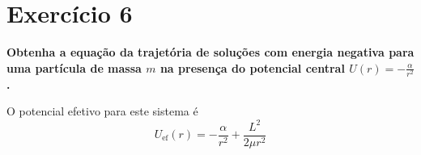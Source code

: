 \section*{Exercício 6}
\textbf{Obtenha a equação da trajetória de soluções com energia negativa para uma partícula de massa \(m\) na presença do potencial central \(U(r) = -\frac{\alpha}{r^2}\).}

O potencial efetivo para este sistema é
\begin{equation*}
    U_\mathrm{ef}(r) = -\frac{\alpha}{r^2} + \frac{L^2}{2\mu r^2}
\end{equation*}
